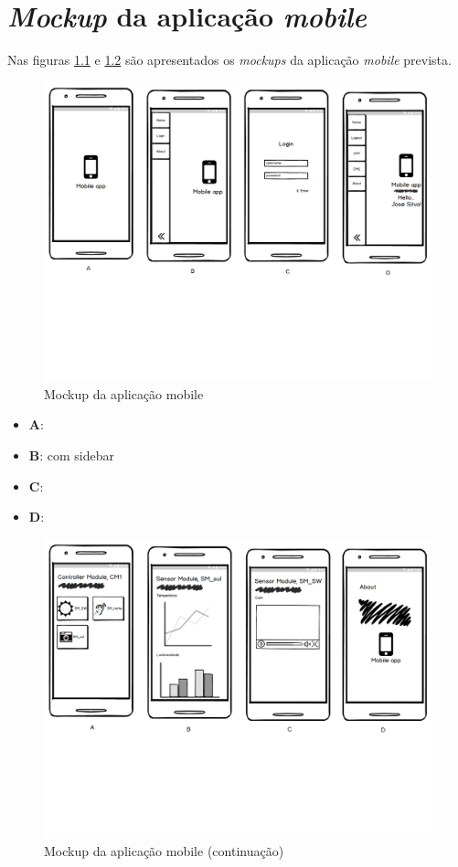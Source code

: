 \chapter{\textit{Mockup} da aplicação \textit{mobile}}
\label{Mockup}

Nas figuras \ref{mock1} e \ref{mock2} são apresentados os \textit{mockups} da aplicação \textit{mobile} prevista. 


\begin{figure}[h]
	\centering
	\includegraphics[width=\linewidth]{esquemas/mockup/1.pdf}
	\caption{Mockup da aplicação mobile}
	\label{mock1}
\end{figure}

\begin{itemize}
	\item \textbf{A}: 
	\item \textbf{B}: com sidebar 
	\item \textbf{C}: 
	\item \textbf{D}:
\end{itemize}


\newpage


\begin{figure}[h]
	\centering
	\includegraphics[width=\linewidth]{esquemas/mockup/2.pdf}
	\caption{Mockup da aplicação mobile (continuação)}
	\label{mock2}
\end{figure}

